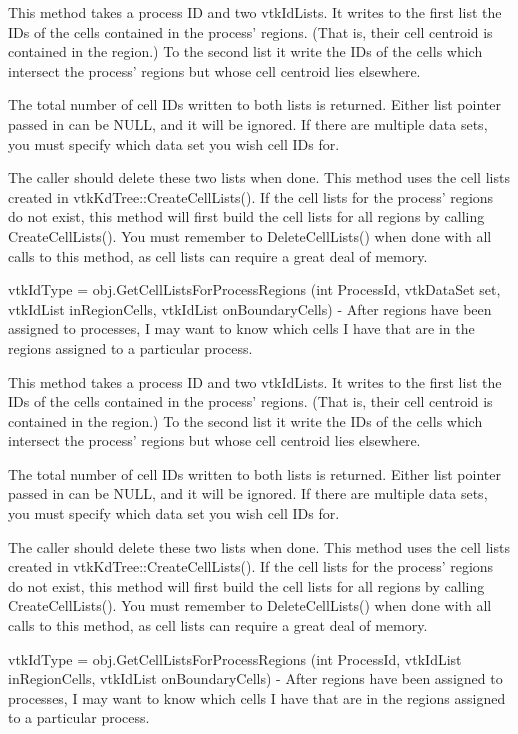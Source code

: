 \begin{DoxyItemize}
This method takes a process I\-D and two vtk\-Id\-Lists. It writes to the first list the I\-Ds of the cells contained in the process' regions. (That is, their cell centroid is contained in the region.) To the second list it write the I\-Ds of the cells which intersect the process' regions but whose cell centroid lies elsewhere.

The total number of cell I\-Ds written to both lists is returned. Either list pointer passed in can be N\-U\-L\-L, and it will be ignored. If there are multiple data sets, you must specify which data set you wish cell I\-Ds for.

The caller should delete these two lists when done. This method uses the cell lists created in vtk\-Kd\-Tree\-::\-Create\-Cell\-Lists(). If the cell lists for the process' regions do not exist, this method will first build the cell lists for all regions by calling Create\-Cell\-Lists(). You must remember to Delete\-Cell\-Lists() when done with all calls to this method, as cell lists can require a great deal of memory.  
\item {\ttfamily vtk\-Id\-Type = obj.\-Get\-Cell\-Lists\-For\-Process\-Regions (int Process\-Id, vtk\-Data\-Set set, vtk\-Id\-List in\-Region\-Cells, vtk\-Id\-List on\-Boundary\-Cells)} -\/ After regions have been assigned to processes, I may want to know which cells I have that are in the regions assigned to a particular process.

This method takes a process I\-D and two vtk\-Id\-Lists. It writes to the first list the I\-Ds of the cells contained in the process' regions. (That is, their cell centroid is contained in the region.) To the second list it write the I\-Ds of the cells which intersect the process' regions but whose cell centroid lies elsewhere.

The total number of cell I\-Ds written to both lists is returned. Either list pointer passed in can be N\-U\-L\-L, and it will be ignored. If there are multiple data sets, you must specify which data set you wish cell I\-Ds for.

The caller should delete these two lists when done. This method uses the cell lists created in vtk\-Kd\-Tree\-::\-Create\-Cell\-Lists(). If the cell lists for the process' regions do not exist, this method will first build the cell lists for all regions by calling Create\-Cell\-Lists(). You must remember to Delete\-Cell\-Lists() when done with all calls to this method, as cell lists can require a great deal of memory.  
\item {\ttfamily vtk\-Id\-Type = obj.\-Get\-Cell\-Lists\-For\-Process\-Regions (int Process\-Id, vtk\-Id\-List in\-Region\-Cells, vtk\-Id\-List on\-Boundary\-Cells)} -\/ After regions have been assigned to processes, I may want to know which cells I have that are in the regions assigned to a particular process.


\end{DoxyItemize}
